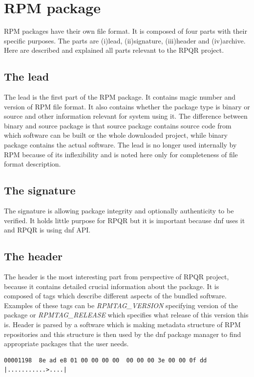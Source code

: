 \section{RPM package}
RPM packages have their own file format\cite{RPMFileFormat}. It is composed of four parts with their specific purposes.
The parts are (i)lead, (ii)signature, (iii)header and (iv)archive. Here are described and explained all parts
relevant to the RPQR project.

\subsection*{The lead}
The lead is the first part of the RPM package. It contains magic number and version of RPM file format.
It also contains whether the package type is binary or source and other information relevant
for system using it. The difference between binary and source package is that source package contains
source code from which software can be built or the whole downloaded project, while binary package
contains the actual software. The lead is no longer used internally by RPM because of its
inflexibility and is noted here only for completeness of file format description.

\subsection*{The signature}
The signature is allowing package integrity and optionally authenticity to be verified. It holds
little purpose for RPQR but it is important because dnf uses it and RPQR is using dnf API.

\subsection*{The header}
The header is the most interesting part from perspective of RPQR project, because it contains
detailed crucial information about the package. It is composed of tags which describe different
aspects of the bundled software. Examples of these tags can be \mbox{\textit{RPMTAG\_VERSION}}
specifying version of the package or \textit{RPMTAG\_RELEASE} which specifies what release of
this version this is. Header is parsed by a software which is making metadata structure of RPM
repositories and this structure is then used by the dnf package manager to find appropriate
packages that the user needs.

\begin{lstlisting}
00001198  8e ad e8 01 00 00 00 00  00 00 00 3e 00 00 0f dd  |...........>....|
\end{lstlisting}

